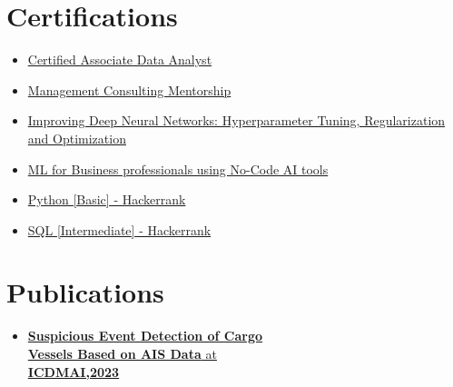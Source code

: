 \documentclass[]{deedy-resume-openfont}
\begin{document}
\begin{minipage}[t]{0.33\textwidth}
\section{Certifications}
\begin{itemize}[label=\textbullet, left=0pt, right=0pt, noitemsep]
    \item \href{https://www.datacamp.com/certificate/DAA0017955149813}{Certified Associate Data Analyst}
    \item \href{https://api.growthschool.io/certificate/818d42d3-2ad2-4fc3-b36c-73b74b176cbd}{Management Consulting Mentorship}
    \item \href{https://www.coursera.org/account/accomplishments/verify/H9MCR2DN3S3W}{Improving Deep Neural Networks: Hyperparameter Tuning, Regularization and Optimization}
    \item \href{https://www.coursera.org/account/accomplishments/verify/H9MCR2DN3S3W}{ML for Business professionals using No-Code AI tools}
    \item \href{https://www.hackerrank.com/certificates/54c9338aea7a}{Python [Basic] - Hackerrank}
    \item \href{https://www.hackerrank.com/certificates/4eb61b3b4e85}{SQL [Intermediate] - Hackerrank}
\end{itemize}
\sectionsep






\section{Publications}
\begin{itemize}[label=\textbullet, left=0pt, right=0pt, noitemsep]
\item\href{https://link.springer.com/chapter/10.1007/978-981-99-1414-2_8}{
\textbf{Suspicious Event Detection of Cargo\\ Vessels
Based on AIS Data} at \\ \textbf{ICDMAI,2023}}
\end{itemize}
\sectionsep

%
%


\end{minipage}%
\hfill
\end{document}

